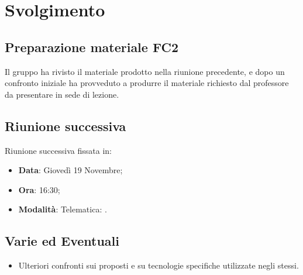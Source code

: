 \documentclass[]{article}
\begin{document}
	\newpage
	
	\section{Svolgimento}
		\subsection{Preparazione materiale FC2}
		Il gruppo ha rivisto il materiale prodotto nella riunione precedente, e dopo un confronto iniziale ha provveduto a produrre il materiale richiesto dal professore da presentare in sede di lezione.\\
		 
		\subsection{Riunione successiva}
		Riunione successiva fissata in:
		\begin{itemize}
			\item \textbf{Data}: Giovedì 19 Novembre;
			\item \textbf{Ora}: 16:30;
			\item \textbf{Modalità}: Telematica: .\\
		\end{itemize}
		
		\subsection{Varie ed Eventuali}
		\begin{itemize}
			\item Ulteriori confronti sui  proposti e su tecnologie specifiche utilizzate negli stessi.
		\end{itemize}
  
\end{document}
